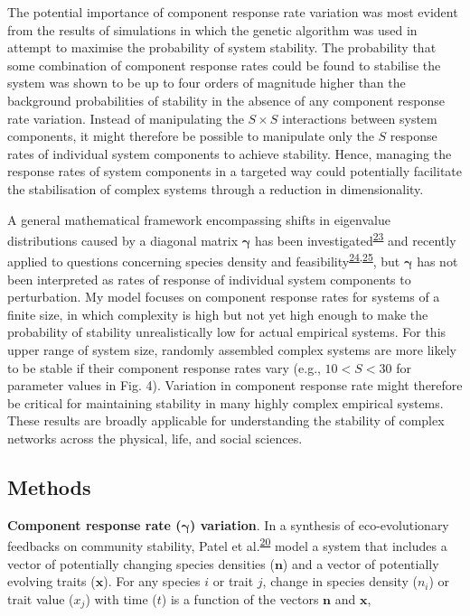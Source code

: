 \documentclass[]{article}
\begin{document}
The potential importance of component response rate variation was most
evident from the results of simulations in which the genetic algorithm
was used in attempt to maximise the probability of system stability. The
probability that some combination of component response rates could be
found to stabilise the system was shown to be up to four orders of
magnitude higher than the background probabilities of stability in the
absence of any component response rate variation. Instead of
manipulating the \(S \times S\) interactions between system components,
it might therefore be possible to manipulate only the \(S\) response
rates of individual system components to achieve stability. Hence,
managing the response rates of system components in a targeted way could
potentially facilitate the stabilisation of complex systems through a
reduction in dimensionality.

A general mathematical framework encompassing shifts in eigenvalue
distributions caused by a diagonal matrix \(\boldsymbol{\gamma}\) has
been
investigated\textsuperscript{\protect\hyperlink{ref-Ahmadian2015}{23}}
and recently applied to questions concerning species density and
feasibility\textsuperscript{\protect\hyperlink{ref-Gibbs2017}{24},\protect\hyperlink{ref-Stone2017}{25}},
but \(\boldsymbol{\gamma}\) has not been interpreted as rates of
response of individual system components to perturbation. My model
focuses on component response rates for systems of a finite size, in
which complexity is high but not yet high enough to make the probability
of stability unrealistically low for actual empirical systems. For this
upper range of system size, randomly assembled complex systems are more
likely to be stable if their component response rates vary (e.g.,
\(10 < S < 30\) for parameter values in Fig. 4). Variation in component
response rate might therefore be critical for maintaining stability in
many highly complex empirical systems. These results are broadly
applicable for understanding the stability of complex networks across
the physical, life, and social sciences.

\subsection{Methods}\label{methods}

\textbf{Component response rate (\(\boldsymbol{\gamma}\)) variation}. In
a synthesis of eco-evolutionary feedbacks on community stability, Patel
et al.\textsuperscript{\protect\hyperlink{ref-Patel2018}{20}} model a system that includes a vector of potentially changing
species densities (\(\mathbf{n}\)) and a vector of potentially evolving
traits
(\(\mathbf{x}\)).
For any species \(i\) or trait \(j\), change in species density
(\(n_{i}\)) or trait value (\(x_{j}\)) with time (\(t\)) is a function
of the vectors \(\mathbf{n}\) and \(\mathbf{x}\),
\end{document}
